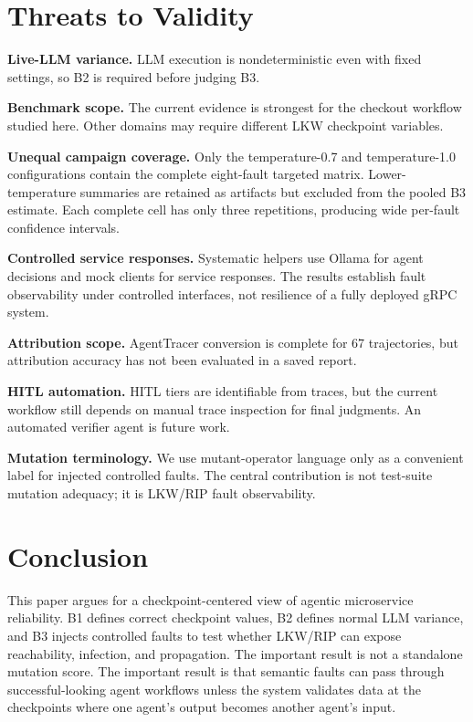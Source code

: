 \documentclass[sigconf,review,anonymous,balance=false]{acmart}
\begin{document}
\section{Threats to Validity}

\textbf{Live-LLM variance.} LLM execution is nondeterministic even with fixed
settings, so B2 is required before judging B3.

\textbf{Benchmark scope.} The current evidence is strongest for the checkout
workflow studied here. Other domains may require different LKW
checkpoint variables.

\textbf{Unequal campaign coverage.} Only the temperature-0.7 and
temperature-1.0 configurations contain the complete eight-fault targeted matrix.
Lower-temperature summaries are retained as artifacts but excluded from the
pooled B3 estimate. Each complete cell has only three repetitions, producing
wide per-fault confidence intervals.

\textbf{Controlled service responses.} Systematic helpers use Ollama for agent
decisions and mock clients for service responses. The results establish fault
observability under controlled interfaces, not resilience of a fully deployed
gRPC system.

\textbf{Attribution scope.} AgentTracer conversion is complete
for 67 trajectories, but attribution accuracy has not been evaluated in a
saved report.

\textbf{HITL automation.} HITL tiers are identifiable from traces, but the
current workflow still depends on manual trace inspection for final judgments.
An automated verifier agent is future work.

\textbf{Mutation terminology.} We use mutant-operator language only as a
convenient label for injected controlled faults. The central contribution is
not test-suite mutation adequacy; it is LKW/RIP fault observability.

\section{Conclusion}

This paper argues for a checkpoint-centered view of agentic
microservice reliability. B1 defines correct checkpoint values, B2 defines
normal LLM variance, and B3 injects controlled faults to test whether LKW/RIP
can expose reachability, infection, and propagation. The important result is
not a standalone mutation score. The important result is that semantic faults
can pass through successful-looking agent workflows unless the system validates
data at the checkpoints where one agent's output becomes another agent's input.
\end{document}
